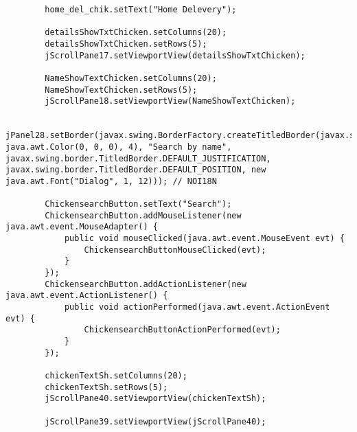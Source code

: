 \documentclass[12pt,a4paper]{article}
\begin{document}
\begin{lstlisting}
        home_del_chik.setText("Home Delevery");

        detailsShowTxtChicken.setColumns(20);
        detailsShowTxtChicken.setRows(5);
        jScrollPane17.setViewportView(detailsShowTxtChicken);

        NameShowTextChicken.setColumns(20);
        NameShowTextChicken.setRows(5);
        jScrollPane18.setViewportView(NameShowTextChicken);

        jPanel28.setBorder(javax.swing.BorderFactory.createTitledBorder(javax.swing.BorderFactory.createLineBorder(new java.awt.Color(0, 0, 0), 4), "Search by name", javax.swing.border.TitledBorder.DEFAULT_JUSTIFICATION, javax.swing.border.TitledBorder.DEFAULT_POSITION, new java.awt.Font("Dialog", 1, 12))); // NOI18N

        ChickensearchButton.setText("Search");
        ChickensearchButton.addMouseListener(new java.awt.event.MouseAdapter() {
            public void mouseClicked(java.awt.event.MouseEvent evt) {
                ChickensearchButtonMouseClicked(evt);
            }
        });
        ChickensearchButton.addActionListener(new java.awt.event.ActionListener() {
            public void actionPerformed(java.awt.event.ActionEvent evt) {
                ChickensearchButtonActionPerformed(evt);
            }
        });

        chickenTextSh.setColumns(20);
        chickenTextSh.setRows(5);
        jScrollPane40.setViewportView(chickenTextSh);

        jScrollPane39.setViewportView(jScrollPane40);


\end{lstlisting}
\end{document}
